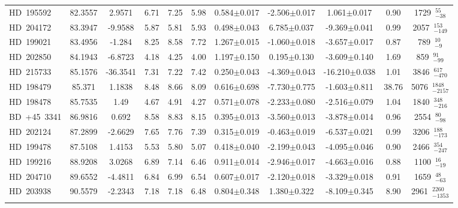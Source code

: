 {\begin{longtable}{lcccccccccc}
\noalign{\smallskip}
HD~195592 & 82.3557 & 2.9571 & 6.71 & 7.25 & 5.98 & 0.584$\pm$0.017 & -2.506$\pm$0.017 & 1.061$\pm$0.017 & 0.90 & 1729~$_{-38}^{55}$ \\
\noalign{\smallskip}
HD~204172 & 83.3947 & -9.9588 & 5.87 & 5.81 & 5.93 & 0.498$\pm$0.043 & 6.785$\pm$0.037 & -9.369$\pm$0.041 & 0.99 & 2057~$_{-149}^{153}$ \\
\noalign{\smallskip}
HD~199021 & 83.4956 & -1.284 & 8.25 & 8.58 & 7.72 & 1.267$\pm$0.015 & -1.060$\pm$0.018 & -3.657$\pm$0.017 & 0.87 & 789~$_{-9}^{10}$ \\
\noalign{\smallskip}
HD~202850 & 84.1943 & -6.8723 & 4.18 & 4.25 & 4.00 & 1.197$\pm$0.150 & 0.195$\pm$0.130 & -3.609$\pm$0.140 & 1.69 & 859~$_{-99}^{91}$ \\
\noalign{\smallskip}
HD~215733 & 85.1576 & -36.3541 & 7.31 & 7.22 & 7.42 & 0.250$\pm$0.043 & -4.369$\pm$0.043 & -16.210$\pm$0.038 & 1.01 & 3846~$_{-470}^{617}$ \\
\noalign{\smallskip}
HD~198479 & 85.371 & 1.1838 & 8.48 & 8.66 & 8.09 & 0.616$\pm$0.698 & -7.730$\pm$0.775 & -1.603$\pm$0.811 & 38.76 & 5076~$_{-2157}^{1848}$ \\
\noalign{\smallskip}
HD~198478 & 85.7535 & 1.49 & 4.67 & 4.91 & 4.27 & 0.571$\pm$0.078 & -2.233$\pm$0.080 & -2.516$\pm$0.079 & 1.04 & 1840~$_{-216}^{348}$ \\
\noalign{\smallskip}
BD~+45~3341 & 86.9816 & 0.692 & 8.58 & 8.83 & 8.15 & 0.395$\pm$0.013 & -3.560$\pm$0.013 & -3.878$\pm$0.014 & 0.96 & 2554~$_{-98}^{80}$ \\
\noalign{\smallskip}
HD~202124 & 87.2899 & -2.6629 & 7.65 & 7.76 & 7.39 & 0.315$\pm$0.019 & -0.463$\pm$0.019 & -6.537$\pm$0.021 & 0.99 & 3206~$_{-173}^{188}$ \\
\noalign{\smallskip}
HD~199478 & 87.5108 & 1.4153 & 5.53 & 5.80 & 5.07 & 0.418$\pm$0.040 & -2.199$\pm$0.043 & -4.095$\pm$0.046 & 0.90 & 2466~$_{-247}^{354}$ \\
\noalign{\smallskip}
HD~199216 & 88.9208 & 3.0268 & 6.89 & 7.14 & 6.46 & 0.911$\pm$0.014 & -2.946$\pm$0.017 & -4.663$\pm$0.016 & 0.88 & 1100~$_{-19}^{16}$ \\
\noalign{\smallskip}
HD~204710 & 89.6552 & -4.4811 & 6.84 & 6.99 & 6.54 & 0.607$\pm$0.017 & -2.120$\pm$0.018 & -3.329$\pm$0.018 & 0.91 & 1659~$_{-63}^{48}$ \\
\noalign{\smallskip}
HD~203938 & 90.5579 & -2.2343 & 7.18 & 7.18 & 6.48 & 0.804$\pm$0.348 & 1.380$\pm$0.322 & -8.109$\pm$0.345 & 8.90 & 2961~$_{-1353}^{2260}$ \\
\noalign{\smallskip}

\end{longtable}}
